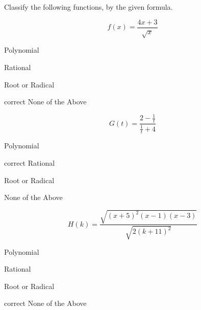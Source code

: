 \documentclass{ximera}
\author{Lee Wayand}
\begin{document}
\begin{exercise}




Classify the following functions, by the given formula.



\begin{question}


\[
f(x) = \frac{4x + 3}{\sqrt{x}}
\]

\begin{multipleChoice}
\item {Polynomial}
\item {Rational}
\item {Root or Radical}
\item [correct]{None of the Above}
\end{multipleChoice}


\end{question}











\begin{question}


\[
G(t) = \frac{2 - \frac{1}{t}}{\frac{1}{t} + 4}
\]

\begin{multipleChoice}
\item {Polynomial}
\item [correct]{Rational}
\item {Root or Radical}
\item {None of the Above}
\end{multipleChoice}


\end{question}







\begin{question}


\[
H(k) = \frac{\sqrt{(x+5)^2 (x-1) (x-3)}}{\sqrt{2(k + 11)^2}}
\]

\begin{multipleChoice}
\item {Polynomial}
\item {Rational}
\item {Root or Radical}
\item [correct]{None of the Above}
\end{multipleChoice}



\end{question}
\end{exercise}
\end{document}
